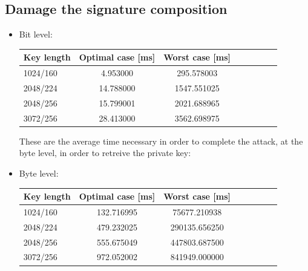 \documentclass[11pt,english]{article}
\begin{document}
\subsection{Damage the signature composition}
\begin{itemize}

These are the average time necessary in order to complete the attack, at the bit level, in order to retreive the private key:\\

\item Bit level:

\begin{center}
\begin{tabular}{l*{6}{c}r}
Key length        & Optimal case [ms] & Worst case [ms] \\
\hline
1024/160 &        4.953000 & 295.578003  \\
2048/224 &       14.788000 & 1547.551025  \\
2048/256 &       15.799001 & 2021.688965  \\
3072/256 &       28.413000 & 3562.698975  \\ 
\end{tabular}
\end{center}

These are the average time necessary in order to complete the attack, at the byte level, in order to retreive the private key:\\

\item Byte level:

\begin{center}
\begin{tabular}{l*{6}{c}r}
Key length        & Optimal case [ms] & Worst case [ms] \\
\hline
1024/160 &        132.716995 & 75677.210938  \\
2048/224 &        479.232025 & 290135.656250  \\
2048/256 &       555.675049  & 447803.687500  \\
3072/256 &       972.052002  & 841949.000000  \\ 
\end{tabular}
\end{center}

\end{itemize}
\end{document}
